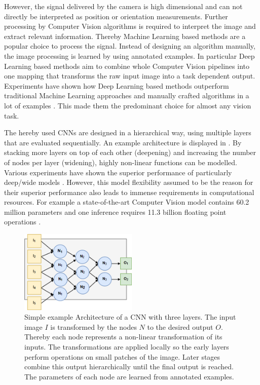 However, the signal delivered by the camera is high dimensional and can not directly be interpreted as position or orientation measurements. Further processing by Computer Vision algorithms is required to interpret the image and extract relevant information. Thereby Machine Learning based methods are a popular choice to process the signal. Instead of designing an algorithm manually, the image processing is learned by using annotated examples. In particular Deep Learning based methods aim to combine whole Computer Vision pipelines into one mapping that transforms the raw input image into a task dependent output. Experiments have shown how Deep Learning based methods outperform traditional Machine Learning approaches and manually crafted algorithms in a lot of examples \cite{Razavian}. This made them the predominant choice for almost any vision task.

The hereby used \acp{CNN} are designed in a hierarchical way, using multiple layers that are evaluated sequentially. An example architecture is displayed in . By stacking more layers on top of each other (deepening) and increasing the number of nodes per layer (widening), highly non-linear functions can be modelled. Various experiments have shown the superior performance of particularly deep/wide models \cite{He, He2015, Szegedy2014, Zagoruyko2016}. However, this model flexibility assumed to be the reason for their superior performance also leads to immense requirements in computational resources. For example a state-of-the-art Computer Vision model \cite{He2015} contains 60.2 million parameters and one inference requires 11.3 billion floating point operations \cite{Tschannen2017}. 

\begin{figure}[bhtp]
	\centering
	\includegraphics[width=0.5\textwidth]{fig/cnn_example}
	\caption{Simple example Architecture of a \ac{CNN} with three layers. The input image $I$ is transformed by the nodes $N$ to the desired output $O$. Thereby each node represents a non-linear transformation of its inputs. The transformations are applied locally so the early layers perform operations on small patches of the image. Later stages combine this output hierarchically until the final output is reached. The parameters of each node are learned from annotated examples.}
	\label{fig:cnn_example}
\end{figure}

